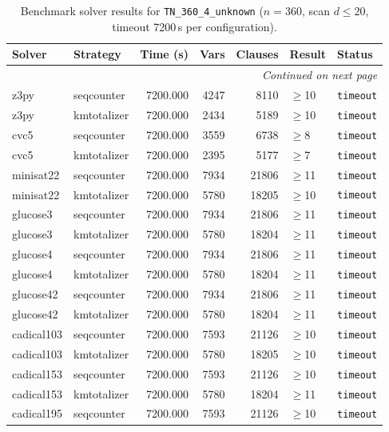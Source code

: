 \begin{longtable}{llrrrl p{}}
\caption{Benchmark solver results for \texttt{TN\_360\_4\_unknown} ($n=360$, scan $d \leq 20$, timeout 7200\,s per configuration).} \label{tab:bench-TN_360_4_unknown} \\
\toprule
Solver & Strategy & Time (s) & Vars & Clauses & Result & Status \\
\midrule
\endhead
\midrule
\multicolumn{7}{r}{\textit{Continued on next page}} \\
\midrule
\endfoot
\bottomrule
\endlastfoot
z3py & seqcounter & 7200.000 & 4247 & 8110 & $\geq$10 & \texttt{timeout} \\
z3py & kmtotalizer & 7200.000 & 2434 & 5189 & $\geq$10 & \texttt{timeout} \\
cvc5 & seqcounter & 7200.000 & 3559 & 6738 & $\geq$8 & \texttt{timeout} \\
cvc5 & kmtotalizer & 7200.000 & 2395 & 5177 & $\geq$7 & \texttt{timeout} \\
minisat22 & seqcounter & 7200.000 & 7934 & 21806 & $\geq$11 & \texttt{timeout} \\
minisat22 & kmtotalizer & 7200.000 & 5780 & 18205 & $\geq$10 & \texttt{timeout} \\
glucose3 & seqcounter & 7200.000 & 7934 & 21806 & $\geq$11 & \texttt{timeout} \\
glucose3 & kmtotalizer & 7200.000 & 5780 & 18204 & $\geq$11 & \texttt{timeout} \\
glucose4 & seqcounter & 7200.000 & 7934 & 21806 & $\geq$11 & \texttt{timeout} \\
glucose4 & kmtotalizer & 7200.000 & 5780 & 18204 & $\geq$11 & \texttt{timeout} \\
glucose42 & seqcounter & 7200.000 & 7934 & 21806 & $\geq$11 & \texttt{timeout} \\
glucose42 & kmtotalizer & 7200.000 & 5780 & 18204 & $\geq$11 & \texttt{timeout} \\
cadical103 & seqcounter & 7200.000 & 7593 & 21126 & $\geq$10 & \texttt{timeout} \\
cadical103 & kmtotalizer & 7200.000 & 5780 & 18205 & $\geq$10 & \texttt{timeout} \\
cadical153 & seqcounter & 7200.000 & 7593 & 21126 & $\geq$10 & \texttt{timeout} \\
cadical153 & kmtotalizer & 7200.000 & 5780 & 18204 & $\geq$11 & \texttt{timeout} \\
cadical195 & seqcounter & 7200.000 & 7593 & 21126 & $\geq$10 & \texttt{timeout} \\

\end{longtable}
